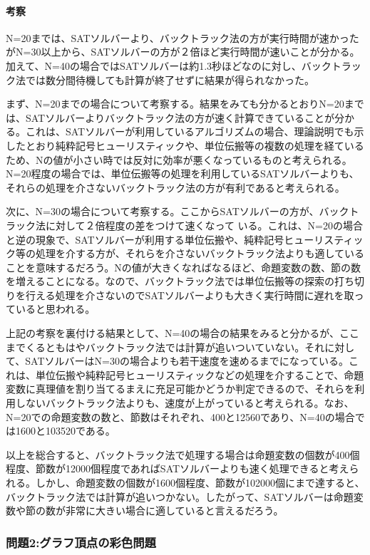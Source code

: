 \documentclass[dvipdfmx]{jsarticle}
\begin{document}
\paragraph{考察}\par
N=20までは、SATソルバーより、バックトラック法の方が実行時間が速かったがN=30以上から、SATソルバーの方が２倍ほど実行時間が速いことが分かる。加えて、N=40の場合ではSATソルバーは約1.3秒ほどなのに対し、バックトラック法では数分間待機しても計算が終了せずに結果が得られなかった。\par
まず、N=20までの場合について考察する。結果をみても分かるとおりN=20までは、SATソルバーよりバックトラック法の方が速く計算できていることが分かる。これは、SATソルバーが利用しているアルゴリズムの場合、理論説明でも示したとおり純粋記号ヒューリスティックや、単位伝搬等の複数の処理を経ているため、Nの値が小さい時では反対に効率が悪くなっているものと考えられる。N=20程度の場合では、単位伝搬等の処理を利用しているSATソルバーよりも、それらの処理を介さないバックトラック法の方が有利であると考えられる。\par
次に、N=30の場合について考察する。ここからSATソルバーの方が、バックトラック法に対して２倍程度の差をつけて速くなって
いる。これは、N=20の場合と逆の現象で、SATソルバーが利用する単位伝搬や、純粋記号ヒューリスティック等の処理を介する方が、それらを介さないバックトラック法よりも適していることを意味するだろう。Nの値が大きくなればなるほど、命題変数の数、節の数を増えることになる。なので、バックトラック法では単位伝搬等の探索の打ち切りを行える処理を介さないのでSATソルバーよりも大きく実行時間に遅れを取っていると思われる。\par
上記の考察を裏付ける結果として、N=40の場合の結果をみると分かるが、ここまでくるともはやバックトラック法では計算が追いついていない。それに対して、SATソルバーはN=30の場合よりも若干速度を速めるまでになっている。これは、単位伝搬や純粋記号ヒューリスティックなどの処理を介することで、命題変数に真理値を割り当てるまえに充足可能かどうか判定できるので、それらを利用しないバックトラック法よりも、速度が上がっていると考えられる。なお、N=20での命題変数の数と、節数はそれぞれ、400と12560であり、N=40の場合では1600と103520である。\par
以上を総合すると、バックトラック法で処理する場合は命題変数の個数が400個程度、節数が12000個程度であればSATソルバーよりも速く処理できると考えられる。しかし、命題変数の個数が1600個程度、節数が102000個にまで達すると、バックトラック法では計算が追いつかない。したがって、SATソルバーは命題変数や節の数が非常に大きい場合に適していると言えるだろう。


\subsubsection{問題2:グラフ頂点の彩色問題}
\end{document}
